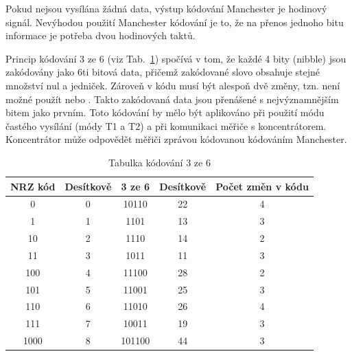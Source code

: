 Pokud nejsou vysílána žádná data, výstup kódování Manchester je hodinový signál. Nevýhodou použití Manchester kódování je to, že na přenos jednoho bitu informace je potřeba dvou hodinových taktů.

Princip kódování 3 ze 6 (viz Tab.~\ref{Table3out6}) spočívá v tom, že každé 4 bity (nibble) jsou zakódovány jako 6ti bitová data, přičemž zakódované slovo obsahuje stejné množství nul a jedniček. Zároveň v kódu musí být alespoň dvě změny, tzn. není možné použít  nebo . Takto zakódovaná data jsou přenášené s nejvýznamnějším bitem jako prvním. Toto kódování by mělo být aplikováno při použití módu častého vysílání (módy T1 a T2) a při komunikaci měřiče s koncentrátorem. Koncentrátor může odpovědět měřiči zprávou kódovanou kódováním Manchester.


\begin{table}[!ht]
\centering
\caption{Tabulka kódování 3 ze 6 \cite{WMencodeing}}
\label{Table3out6}
\begin{tabular}{|c|c|c|c|c|}
\hline
\textbf{NRZ kód} & \textbf{Desítkově} & \textbf{3 ze 6} & \textbf{Desítkově} & \textbf{Počet změn v kódu} \\ \hline \hline
0                & 0                  & 10110               & 22                 & 4                          \\ \hline
1                & 1                  & 1101                & 13                 & 3                          \\ \hline
10               & 2                  & 1110                & 14                 & 2                          \\ \hline
11               & 3                  & 1011                & 11                 & 3                          \\ \hline
100              & 4                  & 11100               & 28                 & 2                          \\ \hline
101              & 5                  & 11001               & 25                 & 3                          \\ \hline
110              & 6                  & 11010               & 26                 & 4                          \\ \hline
111              & 7                  & 10011               & 19                 & 3                          \\ \hline
1000             & 8                  & 101100              & 44                 & 3                          \\ \hline

\end{tabular}
\end{table}
